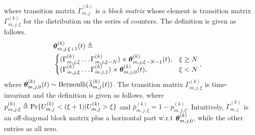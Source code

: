 where transition matrix $\dot{\Gamma}^{(k)}_{m,j}$ is a \emph{block matrix} whose element is transition matrix $\Gamma^{(k)}_{m,j,\xi}$ for the distribution on the series of counters. The definition is given as follows.
\begin{align}
    &\boldsymbol{\theta}^{(k)}_{m,j,\xi+1}(t) \triangleq
    \nonumber\\
    &\begin{cases}
        ( \Gamma^{(k)}_{m,j,\xi} \dots \Gamma^{(k)}_{m,j,\xi-N} ) \times \boldsymbol{\theta}^{(k)}_{m,j,\xi-N-1}({t}), &{\xi \geq N}
        \\
        ( \Gamma^{(k)}_{m,j,\xi} \dots \Gamma^{(k)}_{m,j,1} ) \times \boldsymbol{\theta}^{(k)}_{m,j,0}({t}), &{\xi < N}
    \end{cases},
\end{align}
where $\boldsymbol{\theta}^{(k)}_{m,j,0}({t}) \sim \text{Bernoulli}(\tilde{\lambda}^{(k)}_{m,j}({t}))$. The transition matrix $\Gamma^{(k)}_{m,j,\xi}$ is time-invariant and the definition is given as follows.
where $p^{(k)}_{m,j,\xi} \triangleq \Pr\{U^{(k)}_{m,j} < (\xi+1) | U^{(k)}_{m,j}>\xi\}$ and $\bar{p}^{(k)}_{m,j,\xi} = 1 - p^{(k)}_{m,j,\xi}$.
Intuitively, $\dot{\Gamma}^{(k)}_{m,j}$ is an off-diagonal block matrix plus a horizontal part w.r.t $\boldsymbol{\theta}^{(k)}_{m,j,0}$, while the other entries as all zero.

